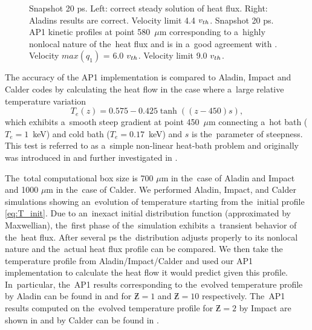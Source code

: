 \begin{figure}[tbh]
\begin{center}
\begin{tabular}{c}
    \end{tabular}
  \caption{  
  Snapshot 20 ps. Left: correct steady solution of heat flux. 
  Right: Aladins results are correct. Velocity limit 4.4 $v_{th}$.
  Snapshot 20 ps. AP1 kinetic profiles at point 580~$\mu$m corresponding to 
  a~highly nonlocal nature of the~heat flux %
  and is in a~good agreement with
  \cite{Sherlock_PoP2017}. Velocity $max(q_1)$ = 6.0 $v_{th}$. 
  Velocity limit 9.0 $v_{th}$.
  }
  \label{fig:C7_Aladin_case5_nonlocal}
  \end{center} 
\end{figure}

The accuracy of the AP1 implementation is compared to Aladin, Impact and Calder
codes by calculating the heat flow in the case
where a~large relative temperature variation
\begin{equation}
  T_e(z) = 0.575 - 0.425 \tanh\left((z-450) s\right) ,
  \label{eq:T_init}
\end{equation}
which exhibits a~smooth steep gradient at point 450~$\mu$m 
connecting a~hot bath ($T_e = 1$~keV) 
and cold bath ($T_e = 0.17$~keV) and $s$ is the~parameter of steepness. 
This test is referred to as a~simple non-linear heat-bath problem and
originally was introduced in \cite{marocchino2013} and further investigated
in  \cite{Sorbo_2015, Sorbo_2016, Sherlock_PoP2017, Brodrick_PoP2017}.


The~total computational box size is 700 $\mu$m in the~case
of Aladin and Impact and 1000 $\mu$m in the~case of Calder.
We performed Aladin, Impact, and Calder simulations showing an~evolution of
temperature starting from the~initial profile \eqref{eq:T_init}. 
Due to an~inexact initial distribution function (approximated by Maxwellian),
the~first phase of the~simulation exhibits a~transient behavior of the~heat
flux. After several ps the~distribution adjusts properly to its nonlocal nature
and the~actual heat flux profile can be compared. 
We then take the temperature profile from Aladin/Impact/Calder and used 
our AP1 implementation to calculate the heat flow
it would predict given this profile. In~particular, the~AP1 results 
corresponding to the~evolved temperature profile by Aladin can be found
in  and  for 
$\Zbar = 1$ and $\Zbar = 10$ respectively. The~AP1 results computed on
the~evolved temperature profile for $\Zbar = 2$ by Impact are shown in 
 and by Calder can be found in 
.

